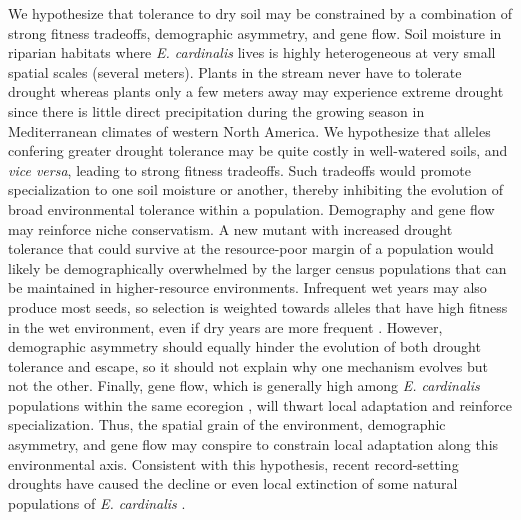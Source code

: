 \documentclass[11pt, oneside]{article}
\begin{document}
We hypothesize that tolerance to dry soil may be constrained by a combination of strong fitness tradeoffs, demographic asymmetry, and gene flow. Soil moisture in riparian habitats where \textit{E. cardinalis} lives is highly heterogeneous at very small spatial scales (several meters). Plants in the stream never have to tolerate drought whereas plants only a few meters away may experience extreme drought since there is little direct precipitation during the growing season in Mediterranean climates of western North America. We hypothesize that alleles confering greater drought tolerance may be quite costly in well-watered soils, and \textit{vice versa}, leading to strong fitness tradeoffs. Such tradeoffs would promote specialization to one soil moisture or another, thereby inhibiting the evolution of broad environmental tolerance within a population. Demography and gene flow may reinforce niche conservatism. A new mutant with increased drought tolerance that could survive at the resource-poor margin of a population would likely be demographically overwhelmed by the larger census populations that can be maintained in higher-resource environments. Infrequent wet years may also produce most seeds, so selection is weighted towards alleles that have high fitness in the wet environment, even if dry years are more frequent \citep{Templeton_Levin_1979, Brown_Venable_1986}. However, demographic asymmetry should equally hinder the evolution of both drought tolerance and escape, so it should not explain why one mechanism evolves but not the other. Finally, gene flow, which is generally high among \textit{E. cardinalis} populations within the same ecoregion \citep{Paul_etal_2016}, will thwart local adaptation and reinforce specialization. Thus, the spatial grain of the environment, demographic asymmetry, and gene flow may conspire to constrain local adaptation along this environmental axis. Consistent with this hypothesis, recent record-setting droughts have caused the decline or even local extinction of some natural populations of \textit{E. cardinalis} \citep{Sheth_Angert_2017}.
\end{document}
